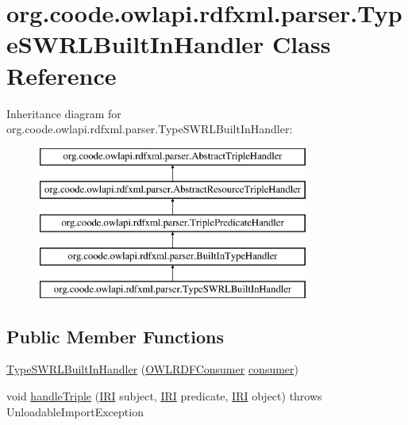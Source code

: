 \hypertarget{classorg_1_1coode_1_1owlapi_1_1rdfxml_1_1parser_1_1_type_s_w_r_l_built_in_handler}{\section{org.\-coode.\-owlapi.\-rdfxml.\-parser.\-Type\-S\-W\-R\-L\-Built\-In\-Handler Class Reference}
\label{classorg_1_1coode_1_1owlapi_1_1rdfxml_1_1parser_1_1_type_s_w_r_l_built_in_handler}
}
Inheritance diagram for org.\-coode.\-owlapi.\-rdfxml.\-parser.\-Type\-S\-W\-R\-L\-Built\-In\-Handler\-:\begin{figure}[H]
\begin{center}
\leavevmode
\includegraphics[height=5.000000cm]{classorg_1_1coode_1_1owlapi_1_1rdfxml_1_1parser_1_1_type_s_w_r_l_built_in_handler}
\end{center}
\end{figure}
\subsection*{Public Member Functions}
\begin{DoxyCompactItemize}
\item 
\hyperlink{classorg_1_1coode_1_1owlapi_1_1rdfxml_1_1parser_1_1_type_s_w_r_l_built_in_handler_a2e1fba0fedf06d9ab49935598d1ec044}{Type\-S\-W\-R\-L\-Built\-In\-Handler} (\hyperlink{classorg_1_1coode_1_1owlapi_1_1rdfxml_1_1parser_1_1_o_w_l_r_d_f_consumer}{O\-W\-L\-R\-D\-F\-Consumer} \hyperlink{classorg_1_1coode_1_1owlapi_1_1rdfxml_1_1parser_1_1_abstract_triple_handler_a4ccf4d898ff01eb1cadfa04b23d54e9c}{consumer})
\item 
void \hyperlink{classorg_1_1coode_1_1owlapi_1_1rdfxml_1_1parser_1_1_type_s_w_r_l_built_in_handler_af7263b0e598ba8a543c27df1e600fe5b}{handle\-Triple} (\hyperlink{classorg_1_1semanticweb_1_1owlapi_1_1model_1_1_i_r_i}{I\-R\-I} subject, \hyperlink{classorg_1_1semanticweb_1_1owlapi_1_1model_1_1_i_r_i}{I\-R\-I} predicate, \hyperlink{classorg_1_1semanticweb_1_1owlapi_1_1model_1_1_i_r_i}{I\-R\-I} object)  throws Unloadable\-Import\-Exception 
\end{DoxyCompactItemize}
